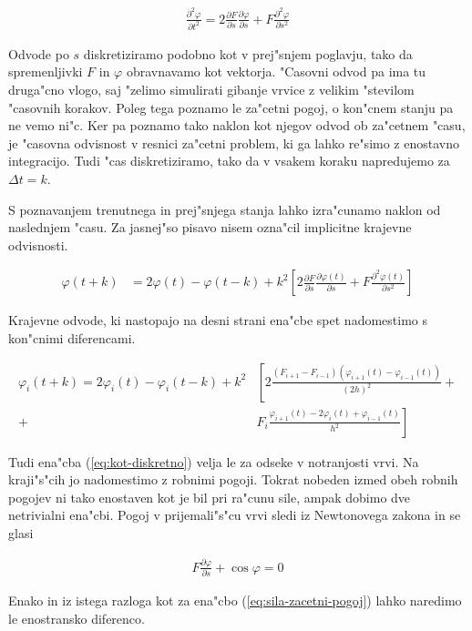 \documentclass[a4paper,10pt]{article}
\renewcommand{\phi}{\varphi}
\newcommand{\parcialno}[2]{
  \frac{\partial #1}{\partial #2}
}
\newcommand{\parcdva}[2]{
  \frac{\partial^2 #1}{\partial #2 ^2}
}
\begin{document}
\begin{align}
 \label{eq:kot}
 \parcdva{\phi}{t} = 2\parcialno{F}{s}\parcialno{\phi}{s} + F\parcdva{\phi}{s}
\end{align}

Odvode po $s$ diskretiziramo podobno kot v prej"snjem poglavju, tako da spremenljivki $F$ in $\phi$ obravnavamo kot vektorja. "Casovni odvod pa ima tu druga"cno vlogo, saj "zelimo simulirati gibanje vrvice z velikim "stevilom "casovnih korakov. Poleg tega poznamo le za"cetni pogoj, o kon"cnem stanju pa ne vemo ni"c. Ker pa poznamo tako naklon kot njegov odvod ob za"cetnem "casu, je "casovna odvisnost v resnici za"cetni problem, ki ga lahko re"simo z enostavno integracijo. Tudi "cas diskretiziramo, tako da v vsakem koraku napredujemo za $\Delta t = k$. 

S poznavanjem trenutnega in prej"snjega stanja lahko izra"cunamo naklon od naslednjem "casu. Za jasnej"so pisavo nisem ozna"cil implicitne krajevne odvisnosti. 

\begin{align}
 \label{eq:kot-razvoj}
 \phi(t+k) &= 2\phi(t) - \phi(t-k) + k^2 \left[ 2\parcialno{F}{s}\parcialno{\phi(t)}{s} + F\parcdva{\phi(t)}{s} \right]
\end{align}

Krajevne odvode, ki nastopajo na desni strani ena"cbe spet nadomestimo s kon"cnimi diferencami. 

\begin{align}
 \phi_i(t+k) = 2\phi_i(t) - \phi_i(t-k) + k^2 &\left[2\frac{(F_{i+1}-F_{i-1})(\phi_{i+1}(t)-\phi_{i-1}(t))}{(2h)^2}\right. + \nonumber \\
+ & \left. F_i\frac{\phi_{i+1}(t) - 2\phi_i(t) + \phi_{i-1}(t)}{h^2}\right] \label{eq:kot-diskretno}
\end{align}

Tudi ena"cba (\ref{eq:kot-diskretno}) velja le za odseke v notranjosti vrvi. Na kraji"s"cih jo nadomestimo z robnimi pogoji. Tokrat nobeden izmed obeh robnih pogojev ni tako enostaven kot je bil pri ra"cunu sile, ampak dobimo dve netrivialni ena"cbi. Pogoj v prijemali"s"cu vrvi sledi iz Newtonovega zakona in se glasi

\begin{align}
 \label{eq:kot-zacetni-pogoj}
 F \parcialno{\phi}{s} + \cos \phi = 0
\end{align}

Enako in iz istega razloga kot za ena"cbo (\ref{eq:sila-zacetni-pogoj}) lahko naredimo le enostransko diferenco. 
\end{document}
